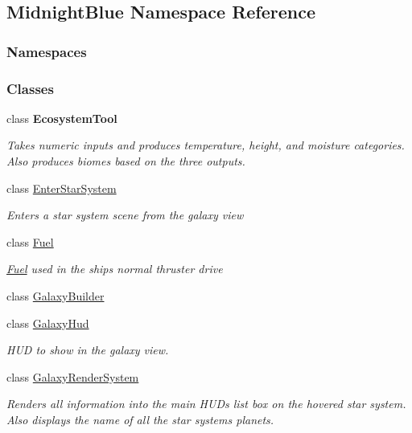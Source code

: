 \hypertarget{namespace_midnight_blue}{}\subsection{Midnight\+Blue Namespace Reference}
\label{namespace_midnight_blue}
\subsubsection*{Namespaces}
\begin{DoxyCompactItemize}
\end{DoxyCompactItemize}
\subsubsection*{Classes}
\begin{DoxyCompactItemize}
\item 
class {\bfseries Ecosystem\+Tool}
\begin{DoxyCompactList}\small\item\em Takes numeric inputs and produces temperature, height, and moisture categories. Also produces biomes based on the three outputs. \end{DoxyCompactList}\item 
class \hyperlink{class_midnight_blue_1_1_enter_star_system}{Enter\+Star\+System}
\begin{DoxyCompactList}\small\item\em Enters a star system scene from the galaxy view \end{DoxyCompactList}\item 
class \hyperlink{class_midnight_blue_1_1_fuel}{Fuel}
\begin{DoxyCompactList}\small\item\em \hyperlink{class_midnight_blue_1_1_fuel}{Fuel} used in the ships normal thruster drive \end{DoxyCompactList}\item 
class \hyperlink{class_midnight_blue_1_1_galaxy_builder}{Galaxy\+Builder}
\item 
class \hyperlink{class_midnight_blue_1_1_galaxy_hud}{Galaxy\+Hud}
\begin{DoxyCompactList}\small\item\em H\+UD to show in the galaxy view. \end{DoxyCompactList}\item 
class \hyperlink{class_midnight_blue_1_1_galaxy_render_system}{Galaxy\+Render\+System}
\begin{DoxyCompactList}\small\item\em Renders all information into the main H\+UD\textquotesingle{}s list box on the hovered star system. Also displays the name of all the star systems planets. \end{DoxyCompactList}\item 

\end{DoxyCompactItemize}

